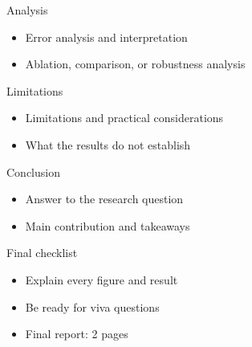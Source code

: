 \documentclass[aspectratio=169]{beamer}
\begin{document}
\begin{frame}{Analysis}
\begin{itemize}
  \item Error analysis and interpretation
  \item Ablation, comparison, or robustness analysis
\end{itemize}
\end{frame}
\begin{frame}{Limitations}
\begin{itemize}
  \item Limitations and practical considerations
  \item What the results do not establish
\end{itemize}
\end{frame}
\begin{frame}{Conclusion}
\begin{itemize}
  \item Answer to the research question
  \item Main contribution and takeaways
\end{itemize}
\end{frame}
\begin{frame}{Final checklist}
\begin{itemize}
  \item Explain every figure and result
  \item Be ready for viva questions
  \item Final report: 2 pages
\end{itemize}
\end{frame}
\end{document}
